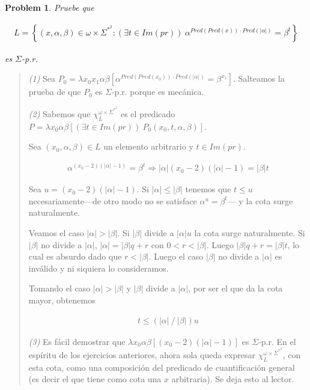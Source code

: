 \documentclass[a4paper, 12pt]{article}
\newtheorem{problem}{Problem}
\newtheorem{problem}{Problem}
\begin{document}
\normalsize





\begin{problem}
    Pruebe que 

    \begin{align*}
        L = \left\{ (x, \alpha, \beta) \in \omega \times \Sigma^{*}^2 : \left(
        \exists t \in Im(pr) \right) ~ \alpha^{Pred(Pred(x)) \cdot
    Pred(|\alpha|)} = \beta^t  \right\} 
    \end{align*}

    es $\Sigma$-p.r. 
\end{problem}


\small
\begin{quote}

    \textit{(1)} Sea $P_0 = \lambda x_0 x_1\alpha\beta \left[
    \alpha^{Pred(Pred(x_0))\cdot Pred(|\alpha|)} = \beta^{x_1}  \right]$. Salteamos la
    prueba de que $P_0$ es $\Sigma$-p.r. porque es mecánica.

    \textit{(2)} Sabemos que $\chi_{L}^{\omega \times  \Sigma^{*}^2}$ es el
    predicado $P = \lambda x_0 \alpha \beta \left[ (\exists t \in Im(pr)) ~
        P_0(x_0,
    t, \alpha, \beta)  \right]$. 

    Sea $(x_0, \alpha, \beta) \in L$ un elemento arbitrario y $t \in Im(pr)$.

    \begin{align*}
        \alpha^{(x_0 - 2)(|\alpha| - 1)} = \beta^{t} \Rightarrow |\alpha|(x_0 -
        2)(|\alpha| - 1) = |\beta| t
    \end{align*}

    Sea $u = (x_0 - 2)(|\alpha| - 1)$. Si $|\alpha| \leq |\beta|$ tenemos que $t
    \leq
    u$ necesariamente---de otro modo no se satisface $\alpha^u = \beta^t$--- y
    la cota surge naturalmente.

    Veamos el caso $|\alpha| > |\beta|$. Si $|\beta|$ divide a $|\alpha|u$ la cota surge
    naturalmente. Si $|\beta|$ no divide a $|\alpha|$, $|\alpha| = |\beta|q +
    r$ con $0 < r < |\beta|$. Luego $|\beta|q+r = |\beta|t$, lo cual es absurdo
    dado que $r < |\beta|$. Luego el caso $|\beta|$ no divide a $|\alpha|$ es
    inválido y ni siquiera lo consideramos.

    Tomando el caso $|\alpha| > |\beta|$ y $|\beta|$ divide a $|\alpha|$, por
    ser el que da la cota mayor, obtenemos

    \begin{align*}
        t \leq \left( |\alpha| ~ / ~ |\beta| \right) u
    \end{align*}

    \textit{(3)} Es fácil demostrar que $\lambda x_0 \alpha \beta \left[ (x_0 -
    2)(|\alpha| - 1)  \right]$ es $\Sigma$-p.r.  En el espíritu de los
    ejercicios anteriores, ahora sola queda expresar $\chi_L^{\omega \times
    \Sigma^{*}^2}$, con esta cota, como una composición del predicado de
    cuantificación general (es decir el que tiene como cota una $x$ arbitraria).
    Se deja esto al lector.









\end{quote}
\normalsize
\end{document}

